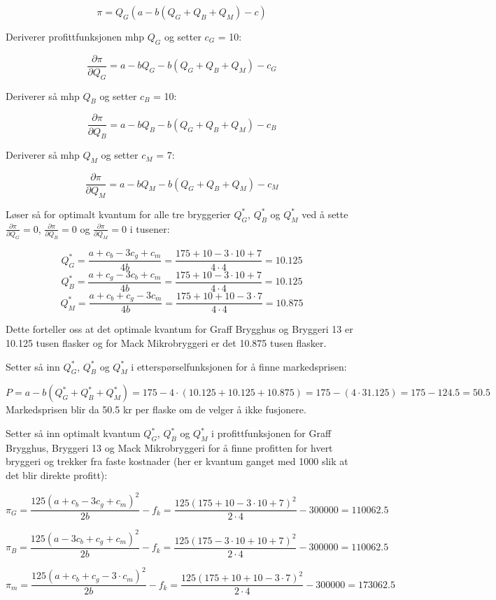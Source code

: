 \documentclass[
  12pt,
  a4paper,
  DIV=11,
  numbers=noendperiod]{scrartcl}
\begin{document}
\[\pi = Q_G(a-b(Q_G+Q_B+Q_M)-c) \tag{18}\]

Deriverer profittfunksjonen mhp \(Q_G\) og setter \(c_G\) = 10:

\[\frac{\partial \pi}{\partial Q_G} = a - bQ_G - b(Q_G+Q_B+Q_M) -c_G \tag{19}\]

Deriverer så mhp \(Q_B\) og setter \(c_B\) = 10:

\[\frac{\partial \pi}{\partial Q_B} = a - bQ_B - b(Q_G+Q_B+Q_M) -c_B \tag{20}\]

Deriverer så mhp \(Q_M\) og setter \(c_M\) = 7:

\[\frac{\partial \pi}{\partial Q_M} = a - bQ_M - b(Q_G+Q_B+Q_M) -c_M \tag{21}\]

Løser så for optimalt kvantum for alle tre bryggerier \(Q_G^*\),
\(Q_B^*\) og \(Q_M^*\) ved å sette
\(\frac{\partial \pi}{\partial Q_G} = 0\),
\(\frac{\partial \pi}{\partial Q_B} = 0\) og
\(\frac{\partial \pi}{\partial Q_M} = 0\) i tusener:

\[Q_G^* = \frac{a + c_b -3 c_g+c_m }{4b} = \frac{175 + 10 -3 \cdot 10+7 }{4 \cdot4} = 10.125 \tag{22}\]
\[Q_B^* = \frac{a + c_g -3 c_b+c_m }{4b} = \frac{175 + 10 -3 \cdot 10+7 }{4 \cdot4} = 10.125 \tag{23}\]
\[Q_M^* = \frac{a + c_b  +c_g-3c_m}{4b} = \frac{175 + 10 +10-3 \cdot 7 }{4 \cdot4} = 10.875 \tag{24}\]

Dette forteller oss at det optimale kvantum for Graff Brygghus og
Bryggeri 13 er 10.125 tusen flasker og for Mack Mikrobryggeri er det
10.875 tusen flasker.

Setter så inn \(Q_G^*\), \(Q_B^*\) og \(Q_M^*\) i etterspørselfunksjonen
for å finne markedsprisen:

\[P = a - b(Q_G^*+Q_B^*+Q_M^*) = 175 - 4 \cdot (10.125+10.125+10.875) = 175 - (4 \cdot 31.125)  = 175 - 124.5 = 50.5 \tag{25}\]
Markedsprisen blir da 50.5 kr per flaske om de velger å ikke fusjonere.

Setter så inn optimalt kvantum \(Q_G^*\), \(Q_B^*\) og \(Q_M^*\) i
profittfunksjonen for Graff Brygghus, Bryggeri 13 og Mack Mikrobryggeri
for å finne profitten for hvert bryggeri og trekker fra faste kostnader
(her er kvantum ganget med 1000 slik at det blir direkte profitt):

\[ \pi_G = \frac{125(a+c_b-3c_g+c_m)^2}{2b} -f_k = \frac{125(175+10-3 \cdot 10+7)^2}{2 \cdot 4} -300000 = 110062.5 \tag{26}\]

\[ \pi_B = \frac{125(a-3c_b+c_g+c_m)^2}{2b} -f_k = \frac{125(175-3 \cdot 10+10+7)^2}{2 \cdot 4} -300000 = 110062.5 \tag{27}\]

\[ \pi_m = \frac{125(a+c_b+c_g-3 \cdot c_m)^2}{2b} -f_k = \frac{125(175+10+10-3 \cdot 7)^2}{2 \cdot 4} -300000 = 173062.5 \tag{28}\]
\end{document}
